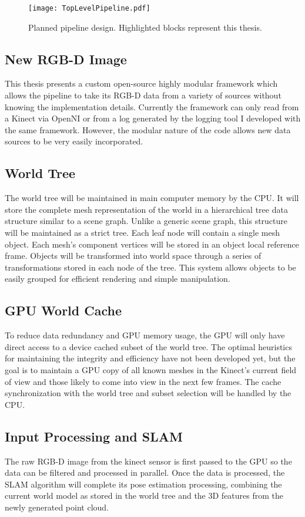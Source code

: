 \begin{figure}[!htpb]
    \centering
    \texttt{[image: TopLevelPipeline.pdf]}
    \caption{Planned pipeline design. Highlighted blocks represent this thesis.}
    \label{fig:toplevelpipeline}
\end{figure}

\subsection{New RGB-D Image}
This thesis presents a custom open-source highly modular framework which allows the pipeline to take its RGB-D data from a variety of sources without knowing the implementation details. Currently the framework can only read from a Kinect via OpenNI or from a log generated by the logging tool I developed with the same framework. However, the modular nature of the code allows new data sources to be very easily incorporated.

\subsection{World Tree}
The world tree will be maintained in main computer memory by the CPU. It will store the complete mesh representation of the world in a hierarchical tree data structure similar to a scene graph. Unlike a generic scene graph, this structure will be maintained as a strict tree. Each leaf node will contain a single mesh object. Each mesh's component vertices will be stored in an object local reference frame. Objects will be transformed into world space through a series of transformations stored in each node of the tree. This system allows objects to be easily grouped for efficient rendering and simple manipulation.

\subsection{GPU World Cache}
To reduce data redundancy and GPU memory usage, the GPU will only have direct access to a device cached subset of the world tree. The optimal heuristics for maintaining the integrity and efficiency have not been developed yet, but the goal is to maintain a GPU copy of all known meshes in the Kinect's current field of view and those likely to come into view in the next few frames. The cache synchronization with the world tree and subset selection will be handled by the CPU.

\subsection{Input Processing and SLAM}
The raw RGB-D image from the kinect sensor is first passed to the GPU so the data can be filtered and processed in parallel. Once the data is processed, the SLAM algorithm will complete its pose estimation processing, combining the current world model as stored in the world tree and the 3D features from the newly generated point cloud.


